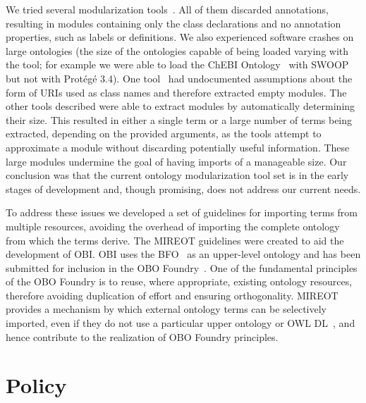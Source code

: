 \documentclass[jou]{ao2e}%
\begin{document}
We tried several modularization tools~\citep{Grau2, Jimenez,Seidenberg,Sirin}. 
All of them discarded annotations, resulting in modules containing only the class declarations and no annotation properties, such as labels or definitions.
We also experienced software crashes on large ontologies (the size of the ontologies capable of being loaded varying with the tool; for example we were able to load the \ac{ChEBI} Ontology~\citep{ChEBI} with SWOOP but not with Prot\'eg\'e 3.4).
One tool~\citep{Seidenberg} had undocumented assumptions about the form of URIs used as class names and therefore extracted empty modules. 
The other tools described were able to extract modules by automatically determining their size. This resulted in either a single term or a large number of terms being extracted, depending on the provided arguments, as the tools attempt to approximate a module without discarding potentially useful information. These large modules undermine the goal of having imports of a manageable size.
Our conclusion was that the current ontology modularization tool set is in the early stages of development and, though promising, does not address our current needs.

To address these issues we developed a set of guidelines for importing terms from multiple resources, avoiding the overhead of importing the complete ontology from which the terms derive. 
The \ac{MIREOT} guidelines were created to aid the development of \ac{OBI}.
\ac{OBI} uses the \ac{BFO}~\citep{BFO} as an upper-level ontology and has been submitted for inclusion in the \ac{OBO} Foundry~\citep{OBOFoundry}. 
One of the fundamental principles of the \ac{OBO} Foundry is to reuse, where appropriate, existing ontology resources, therefore avoiding duplication of effort and ensuring orthogonality.
\ac{MIREOT} provides a mechanism by which external ontology terms can be selectively imported, even if they do not use a particular upper ontology or OWL DL~\citep{Horrocks}, and hence contribute to the realization of OBO Foundry principles.

\section{Policy}
\end{document}
